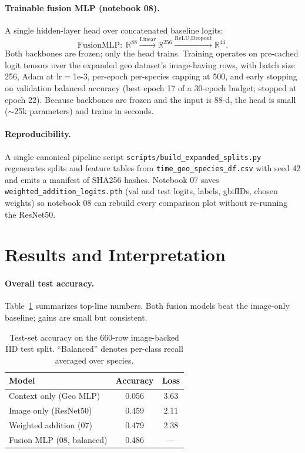 \documentclass[11pt]{article}
\begin{document}
\paragraph{Trainable fusion MLP (notebook 08).} A single hidden-layer head over concatenated baseline logits:
\[
\mathrm{FusionMLP}: \; \mathbb{R}^{88} \xrightarrow{\text{Linear}} \mathbb{R}^{256} \xrightarrow{\text{ReLU}, \text{Dropout}} \mathbb{R}^{44}.
\]
Both backbones are frozen; only the head trains. Training operates on pre-cached logit tensors over the expanded geo dataset's image-having rows, with batch size 256, Adam at lr$=$1e-3, per-epoch per-species capping at 500, and early stopping on validation balanced accuracy (best epoch 17 of a 30-epoch budget; stopped at epoch 22). Because backbones are frozen and the input is 88-d, the head is small ($\sim$25k parameters) and trains in seconds.

\paragraph{Reproducibility.} A single canonical pipeline script \texttt{scripts/build\_expanded\_splits.py} regenerates splits and feature tables from \texttt{time\_geo\_species\_df.csv} with seed 42 and emits a manifest of SHA256 hashes. Notebook 07 saves \texttt{weighted\_addition\_logits.pth} (val and test logits, labels, gbifIDs, chosen weights) so notebook 08 can rebuild every comparison plot without re-running the ResNet50.

\section{Results and Interpretation}

\paragraph{Overall test accuracy.} Table~\ref{tab:overall} summarizes top-line numbers. Both fusion models beat the image-only baseline; gains are small but consistent.

\begin{table}[h]
\centering
\caption{Test-set accuracy on the 660-row image-backed IID test split. ``Balanced'' denotes per-class recall averaged over species.}
\label{tab:overall}
\begin{tabular}{lcc}
\toprule
Model & Accuracy & Loss \\
\midrule
Context only (Geo MLP) & 0.056 & 3.63 \\
Image only (ResNet50)  & 0.459 & 2.11 \\
Weighted addition (07) & 0.479 & 2.38 \\
Fusion MLP (08, balanced) & 0.486 & --- \\
\bottomrule
\end{tabular}
\end{table}
\end{document}
